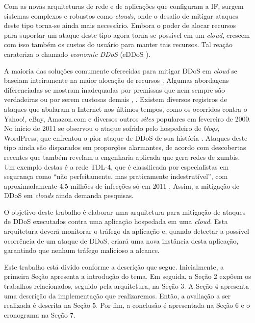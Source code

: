 Com as novas arquiteturas de rede e de aplicações que configuram a IF, surgem sistemas complexos e robustos como \emph{clouds}, onde o desafio de mitigar ataques deste tipo torna-se ainda mais necessário.  Embora o poder de
alocar recursos para suportar um ataque deste tipo  agora torna-se
possível em um \emph{cloud}, crescem com isso também os custos do usuário para manter tais recursos. Tal reação
carateriza o chamado \emph{economic DDoS} (eDDoS \cite{Soon:10}).
  
A maioria das soluções comumente oferecidas para mitigar DDoS em \emph{cloud} se baseiam inteiramente na maior alocação de
recursos \cite{Peng:2007:SND:1216370.1216373}.  %
%
Algumas abordagens diferenciadas se mostram inadequadas por premissas que nem sempre são verdadeiras ou por serem custosas demais \cite{Bakshi:10}, \cite{Liu:2010:NFD:1866835.1866849}.
Existem diversos registros de ataques que abalaram a Internet nos últimos tempos, como os ocorridos contra o Yahoo!, eBay, Amazon.com e diversos outros \emph{sites} populares em fevereiro de 2000.  No início de 2011 se observou o ataque sofrido pelo hospedeiro de \emph{blogs}, WordPress, que enfrentou o pior ataque de DDoS de sua história \cite{infoexame}. Ataques deste tipo ainda são disparados em proporções alarmantes, de acordo com descobertas recentes que também revelam a engenharia aplicada que gera redes de zumbis. Um exemplo destas é a rede TDL-4, que é classificada por especialistas em segurança como “não perfeitamente, mas praticamente indestrutível”, com aproximadamente 4,5 milhões de infecções só em 2011 \cite{tdl4}. Assim, a mitigação de DDoS em \emph{clouds} ainda demanda pesquisas.

O objetivo deste trabalho é elaborar uma arquitetura para mitigação de ataques de
DDoS executados contra uma aplicação hospedada em uma \emph{cloud}. Esta
arquitetura deverá monitorar o tráfego da aplicação e, quando
detectar a possível ocorrência de um ataque de DDoS, criará uma nova
instância desta aplicação, garantindo que nenhum tráfego malicioso a alcance. 


Este trabalho está divido conforme a descrição que segue. Inicialmente,  
a primeira Seção apresenta a introdução do tema. Em seguida, a Seção 2 expõem os trabalhos relacionados, seguido pela arquitetura, na Seção 3. A Seção 4 apresenta uma descrição da implementação que realizaremos. Então, a avaliação a ser realizada é descrita na Seção 5. Por fim, a conclusão é apresentada na Seção 6 e o cronograma na Seção 7.

